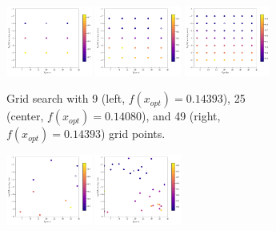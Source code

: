 \begin{figure}[H]
	\begin{subfigure}{\textwidth}
		\centering
		\includegraphics[width=0.31\textwidth]{figures/Results/First_comparison/Grid10}
		\includegraphics[width=0.31\textwidth]{figures/Results/First_comparison/Grid30}
		\includegraphics[width=0.31\textwidth]{figures/Results/First_comparison/Grid50}
		\caption{ Grid search with 9 (left, $f(x_{opt}) = 0.14393$), 25 (center, $f(x_{opt}) = 0.14080$), and 49 (right, $f(x_{opt}) = 0.14393$) grid points.}
		\label{fig:first_comparison_grid_search}
	\end{subfigure}
	\begin{subfigure}{\textwidth}
		\centering
		\includegraphics[width=0.31\textwidth]{figures/Results/First_comparison/Random10}
		\includegraphics[width=0.31\textwidth]{figures/Results/First_comparison/Random30}

\end{subfigure}
\end{figure}
